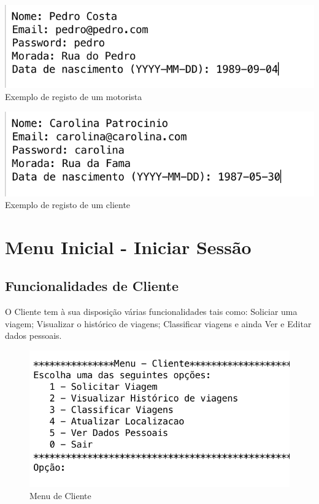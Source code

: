 \noindent\begin{minipage}[b]{.4\textwidth}
	\includegraphics[scale=0.6]{imagem/exemploregistomotorista}
	\small{Exemplo de registo de um motorista}
\end{minipage} 
\hfill
\begin{minipage}[b]{.4\textwidth}
	\includegraphics[scale=0.6]{imagem/exemploderegistocliente}
	\small{Exemplo de registo de um cliente}
\end{minipage}
\hfill

\section{Menu Inicial - Iniciar Sessão }
\subsection{Funcionalidades de Cliente}
O Cliente tem à sua disposição várias funcionalidades tais como: Soliciar uma viagem; Visualizar o histórico de viagens; Classificar viagens e ainda Ver e Editar dados pessoais. 
\begin{figure}[htpb]
	\centering
	\includegraphics[scale=0.7]{imagem/menuCliente}
	\caption{Menu de Cliente }
	\label{p3:fig:p3_menuCliente}
\end{figure}

